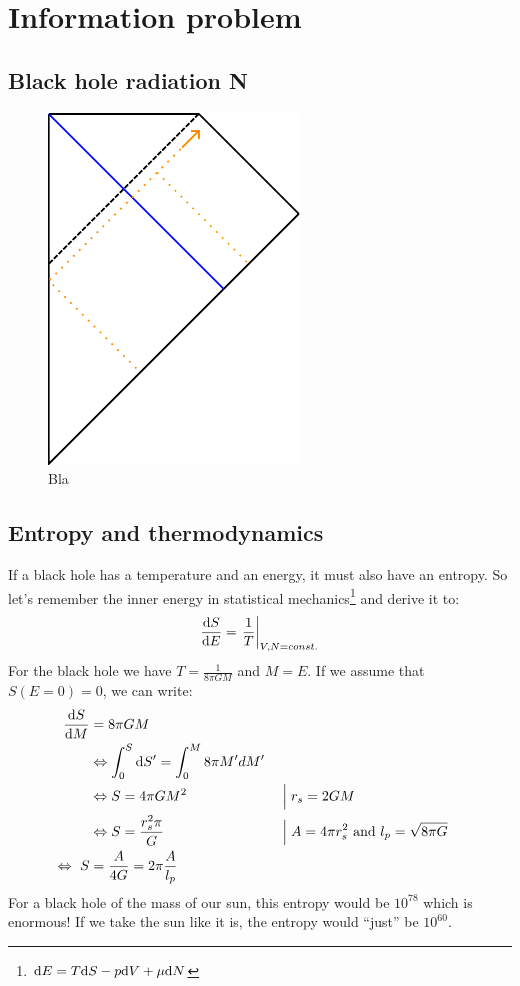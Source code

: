 \section{Information problem}

	\subsection{Black hole radiation N} 
	\begin{figure}
		\begin{center}
			\includegraphics[scale=1]{collapse2}
			\caption{Bla} \label{plots_of_V}
		\end{center}
	\end{figure}

	\subsection{Entropy and thermodynamics \checkmark}
	If a black hole has a temperature and an energy, it must also have an entropy. So let's remember the inner energy in statistical mechanics\footnote{$\mathrm{d} E = 
	T \mathrm{d} S - p \mathrm{d} V + \mu \mathrm{d} N$} and derive it to:
		\begin{equation}
			\frac{\mathrm{d} S}{\mathrm{d} E} = \left. \frac{1}{T} \right|_{V,N=const.}
		\end{equation}
	For the black hole we have $T = \frac{1}{8 \pi G M}$ and $M=E$. If we assume that $S(E=0) = 0$, we can write:
		\begin{align}
			\frac{\mathrm{d} S}{\mathrm{d} M} &= 8 \pi G M \nonumber \\
			&\Leftrightarrow \int_0^S \mathrm{d} S' = \int_0^M 8 \pi M' dM' \nonumber\\
			&\Leftrightarrow S = 4 \pi G M^2 & & \Bigm| r_s = 2GM \nonumber\\
			&\Leftrightarrow S = \frac{r_s^2 \pi}{G}  & & \Bigm| A=4 \pi r_s^2 \text{~and~} l_p = \sqrt{8 \pi G} \nonumber\\
			\Leftrightarrow~
			S &= \frac{A}{4G} = 2 \pi \frac{A}{l_p} \label{entropy}
		\end{align}
	For a black hole of the mass of our sun, this entropy would be $10^{78}$ which is enormous! If we take the sun like it is, the entropy would ``just'' be $10^{60}$. 
	
